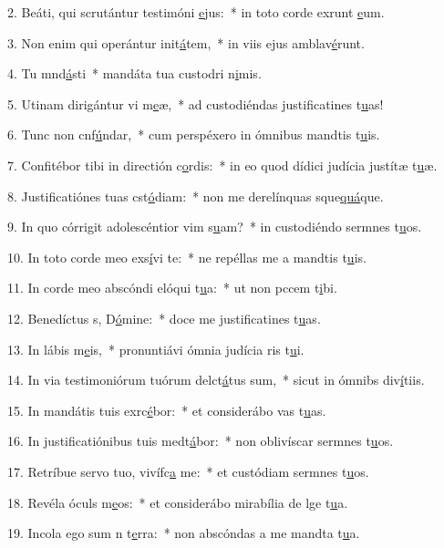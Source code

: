 2. Beáti, qui scrutántur testimóni \uline{e}jus:~* in toto corde exrunt \uline{e}um.\par 
3. Non enim qui operántur init\uline{á}tem,~* in viis ejus amblav\uline{é}runt.\par 
4. Tu mnd\uline{á}sti~* mandáta tua custodri n\uline{i}mis.\par 
5. Utinam dirigántur vi m\uline{e}æ,~* ad custodiéndas justificatines t\uline{u}as!\par 
6. Tunc non cnf\uline{ú}ndar,~* cum perspéxero in ómnibus mandtis t\uline{u}is.\par 
7. Confitébor tibi in directión c\uline{o}rdis:~* in eo quod dídici judícia justítæ t\uline{u}æ.\par 
8. Justificatiónes tuas cst\uline{ó}diam:~* non me derelínquas sque\uline{quá}que.\par 
9. In quo córrigit adolescéntior vim s\uline{u}am?~* in custodiéndo sermnes t\uline{u}os.\par 
10. In toto corde meo exs\uline{í}vi te:~* ne repéllas me a mandtis t\uline{u}is.\par 
11. In corde meo abscóndi elóqui t\uline{u}a:~* ut non pccem t\uline{i}bi.\par 
12. Benedíctus s, D\uline{ó}mine:~* doce me justificatines t\uline{u}as.\par 
13. In lábis m\uline{e}is,~* pronuntiávi ómnia judícia ris t\uline{u}i.\par 
14. In via testimoniórum tuórum delct\uline{á}tus sum,~* sicut in ómnibs div\uline{í}tiis.\par 
15. In mandátis tuis exrc\uline{é}bor:~* et considerábo vas t\uline{u}as.\par 
16. In justificatiónibus tuis medt\uline{á}bor:~* non oblivíscar sermnes t\uline{u}os.\par 
17. Retríbue servo tuo, vivífc\uline{a} me:~* et custódiam sermnes t\uline{u}os.\par 
18. Revéla óculs m\uline{e}os:~* et considerábo mirabília de lge t\uline{u}a.\par 
19. Incola ego sum n t\uline{e}rra:~* non abscóndas a me mandta t\uline{u}a.\par 
